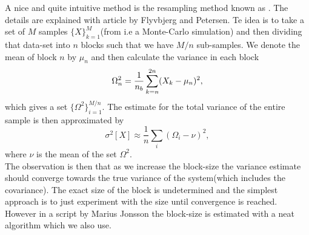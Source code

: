    A nice and quite intuitive method is the resampling method known as
    . The details are explained with article \cite{blocking} by
    Flyvbjerg and Petersen. Te idea is to take a set of $M$ samples
    $\{X\}^M_{k=1}$(from i.e a Monte-Carlo simulation) and then dividing that
    data-set into $n$ blocks such that we have $M/n$ sub-samples. We denote the
    mean of block $n$ by $\mu_n$ and then calculate the variance in each block
        \begin{equation}
            \Omega^2_n = \frac{1}{n_b}\suml{k=n}{2n} (X_k - \mu_n)^2,
        \end{equation}
    which gives a set $\{\Omega^2\}^{M/n}_{i=1}$. The estimate for the total
    variance of the entire sample is then approximated by
        \begin{equation}
            \sigma^2[X] \approx \frac{1}{n} \sum_i (\Omega_i - \nu)^2,
        \end{equation}
    where $\nu$ is the mean of the set $\Omega^2$. \\
    The observation is then that as we increase the block-size the variance
    estimate should converge towards the true variance of the system(which
    includes the covariance). The exact size of the block is undetermined and
    the simplest approach is to just experiment with the size until convergence
    is reached. \\
    However in a script by Marius Jonsson \cite{vmc} the block-size is
    estimated with a neat algorithm which we also use.


